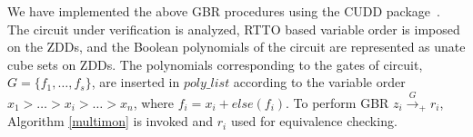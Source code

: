    



We have implemented the above GBR procedures using the CUDD 
package~\cite{cudd}. The circuit under verification is analyzed, RTTO based
variable order is imposed on the ZDDs, and the Boolean polynomials of
the circuit are represented as unate cube sets on ZDDs. 
The polynomials corresponding to the gates of circuit,
$G=\{f_1,\dots,f_s\}$, are inserted in $poly\_list$ according to the
variable order $x_1 > \dots > x_i > \dots > x_n$, where $f_i = x_i +
else(f_i)$. %
To perform GBR $z_i\xrightarrow{G}_+ r_i$,
Algorithm \ref{multimon} is invoked and $r_i$ used for  equivalence checking. 
